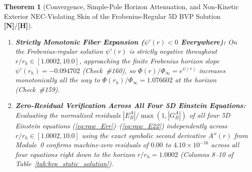 \documentclass[11pt,a4paper]{article}
\newcommand{\catH}{\textbf{\textcolor{orange!85!black}{[H]}}}
\newcommand{\catN}{\textbf{\textcolor{teal!75!black}{[N]}}}
\newtheorem{theorem}{Theorem}[section]
\theoremstyle{definition}
\theoremstyle{remark}
\begin{document}
\begin{theorem}[Convergence, Simple-Pole Horizon Attenuation, and Non-Kinetic Exterior NEC-Violating Skin of the Frobenius-Regular 5D BVP Solution \catN/\catH]
\begin{enumerate}
  \item[\textnormal{(iii)}] \textbf{Strictly Monotonic Fiber Expansion ($\psi'(r) < 0$ Everywhere):} On the Frobenius-regular solution $\psi'(r)$ is strictly negative throughout $r/r_h \in [1.0002, 10.0]$, approaching the finite Frobenius horizon slope $\psi'(r_h) = -0.094702$ (Check~\#160), so $\Phi(r)/\Phi_{\infty} = e^{\psi(r)}$ increases monotonically all the way to $\Phi(r_h)/\Phi_{\infty} = \mathbf{1.076602}$ at the horizon (Check~\#159).
  \item[\textnormal{(iv)}] \textbf{Zero-Residual Verification Across All Four 5D Einstein Equations:} Evaluating the normalized residuals $|E^A_B|/\max(1, |G^A_B|)$ of all four 5D Einstein equations (\ref{eq:raw_Err})--(\ref{eq:raw_E22}) independently across $r/r_h \in [1.0002, 10.0]$ using the exact symbolic second derivative $A''(r)$ from Module~0 confirms machine-zero residuals of $0.00$ to $4.10 \times 10^{-16}$ across all four equations right down to the horizon $r/r_h = 1.0002$ (Columns 8--10 of Table~\ref{tab:bvp_static_solution}).
\end{enumerate}
\end{theorem}
\end{document}
